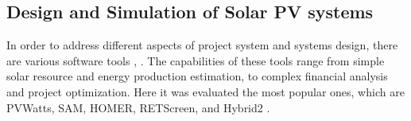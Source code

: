 \documentclass[journal]{IEEEtran}
\begin{document}
\subsection{Design and Simulation of Solar PV systems}
%
In order to address different aspects of project system and systems design, there are various software tools \cite{Rajanna}, \cite{Rawat}.
The capabilities of these tools range from simple solar resource and energy production estimation, %
 to complex financial analysis and project optimization. 
%
Here it was evaluated the most popular ones, which are PVWatts, SAM, HOMER, RETScreen, and Hybrid2 \cite{Pradhan,Swarnkar,NRELDobos,NRELBlair,Mills}.

\end{document}
